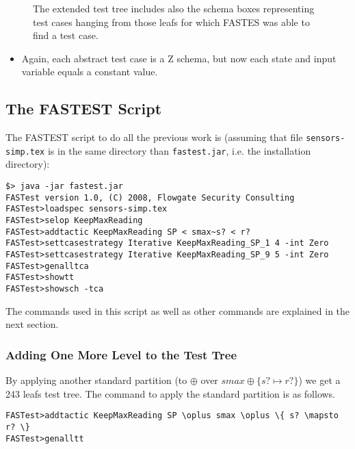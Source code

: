 \begin{figure}

\caption{\label{csett}The extended test tree includes also the schema boxes representing test cases hanging from those leafs for which FASTES was able to find a test case.}
\end{figure}

\begin{itemize}
\item Again, each abstract test case is a Z schema, but now each state and input variable equals a constant value.
\end{itemize}

\begin{multicols}{2}

\end{multicols}


\subsection{The FASTEST Script}

The FASTEST script to do all the previous work is (assuming that file \verb+sensors-simp.tex+ is in the same directory than \verb+fastest.jar+, i.e. the installation directory):

\begin{verbatim}
$> java -jar fastest.jar
FASTest version 1.0, (C) 2008, Flowgate Security Consulting
FASTest>loadspec sensors-simp.tex
FASTest>selop KeepMaxReading
FASTest>addtactic KeepMaxReading SP < smax~s? < r?
FASTest>settcasestrategy Iterative KeepMaxReading_SP_1 4 -int Zero
FASTest>settcasestrategy Iterative KeepMaxReading_SP_9 5 -int Zero
FASTest>genalltca
FASTest>showtt
FASTest>showsch -tca
\end{verbatim}

The commands used in this script as well as other commands are explained in the next section.

\subsubsection{Adding One More Level to the Test Tree}

By applying another standard partition (to $\oplus$ over $smax \oplus \{ s? \mapsto r? \}$) we get a 243 leafs  test tree. The command to apply the standard partition is as follows.

\begin{verbatim}
FASTest>addtactic KeepMaxReading SP \oplus smax \oplus \{ s? \mapsto r? \}
FASTest>genalltt
\end{verbatim}



